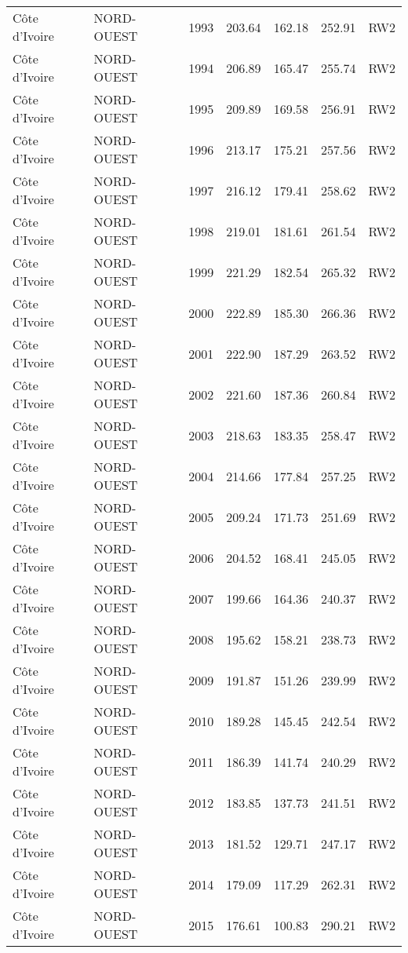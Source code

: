 \begin{longtable}{lllrrrl}
  C\^{o}te d'Ivoire & NORD-OUEST & 1993 & 203.64 & 162.18 & 252.91 & RW2 \\ 
  C\^{o}te d'Ivoire & NORD-OUEST & 1994 & 206.89 & 165.47 & 255.74 & RW2 \\ 
  C\^{o}te d'Ivoire & NORD-OUEST & 1995 & 209.89 & 169.58 & 256.91 & RW2 \\ 
  C\^{o}te d'Ivoire & NORD-OUEST & 1996 & 213.17 & 175.21 & 257.56 & RW2 \\ 
  C\^{o}te d'Ivoire & NORD-OUEST & 1997 & 216.12 & 179.41 & 258.62 & RW2 \\ 
  C\^{o}te d'Ivoire & NORD-OUEST & 1998 & 219.01 & 181.61 & 261.54 & RW2 \\ 
  C\^{o}te d'Ivoire & NORD-OUEST & 1999 & 221.29 & 182.54 & 265.32 & RW2 \\ 
  C\^{o}te d'Ivoire & NORD-OUEST & 2000 & 222.89 & 185.30 & 266.36 & RW2 \\ 
  C\^{o}te d'Ivoire & NORD-OUEST & 2001 & 222.90 & 187.29 & 263.52 & RW2 \\ 
  C\^{o}te d'Ivoire & NORD-OUEST & 2002 & 221.60 & 187.36 & 260.84 & RW2 \\ 
  C\^{o}te d'Ivoire & NORD-OUEST & 2003 & 218.63 & 183.35 & 258.47 & RW2 \\ 
  C\^{o}te d'Ivoire & NORD-OUEST & 2004 & 214.66 & 177.84 & 257.25 & RW2 \\ 
  C\^{o}te d'Ivoire & NORD-OUEST & 2005 & 209.24 & 171.73 & 251.69 & RW2 \\ 
  C\^{o}te d'Ivoire & NORD-OUEST & 2006 & 204.52 & 168.41 & 245.05 & RW2 \\ 
  C\^{o}te d'Ivoire & NORD-OUEST & 2007 & 199.66 & 164.36 & 240.37 & RW2 \\ 
  C\^{o}te d'Ivoire & NORD-OUEST & 2008 & 195.62 & 158.21 & 238.73 & RW2 \\ 
  C\^{o}te d'Ivoire & NORD-OUEST & 2009 & 191.87 & 151.26 & 239.99 & RW2 \\ 
  C\^{o}te d'Ivoire & NORD-OUEST & 2010 & 189.28 & 145.45 & 242.54 & RW2 \\ 
  C\^{o}te d'Ivoire & NORD-OUEST & 2011 & 186.39 & 141.74 & 240.29 & RW2 \\ 
  C\^{o}te d'Ivoire & NORD-OUEST & 2012 & 183.85 & 137.73 & 241.51 & RW2 \\ 
  C\^{o}te d'Ivoire & NORD-OUEST & 2013 & 181.52 & 129.71 & 247.17 & RW2 \\ 
  C\^{o}te d'Ivoire & NORD-OUEST & 2014 & 179.09 & 117.29 & 262.31 & RW2 \\ 
  C\^{o}te d'Ivoire & NORD-OUEST & 2015 & 176.61 & 100.83 & 290.21 & RW2 \\ 

\end{longtable}
